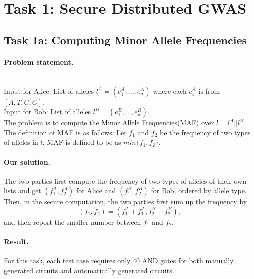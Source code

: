 \section{Task 1: Secure Distributed GWAS}
\subsection*{Task 1a: Computing Minor Allele Frequencies}
\paragraph{Problem statement.}
~\\
Input for Alice: List of alleles $l^A = (e^A_1,...,e^A_n)$ where each $e^A_i$ is from $[A, T, C, G]$.\\
Input for Bob: List of alleles $l^B = (e^B_1,...,e^B_n)$.\\

The problem is to compute the 
Minor Allele Frequencies(MAF) over $l = l^A || l^B$. The definition of MAF is as follows:
Let $f_1$ and $f_2$ be the frequency of two types of alleles in $l$. MAF is defined to be as $min\{f_1, f_2\}$.

\paragraph{Our solution.}
The two parties first compute the frequency of two types of alleles of their own lists and get
$(f^A_1, f^A_2)$ for Alice and $(f^B_1,f^B_2)$ for Bob, ordered by allele type.
Then, in the secure computation, the two parties first sum up the frequency by
$$(f_1, f_2) = (f^A_1+f^A_1, f^B_2+f^B_2),$$
and then report the smaller number between $f_1$ and $f_2$.
\paragraph{Result.}
For this task, each test case requires only 40 AND gates for both manually generated circuits and automatically generated circuits.

